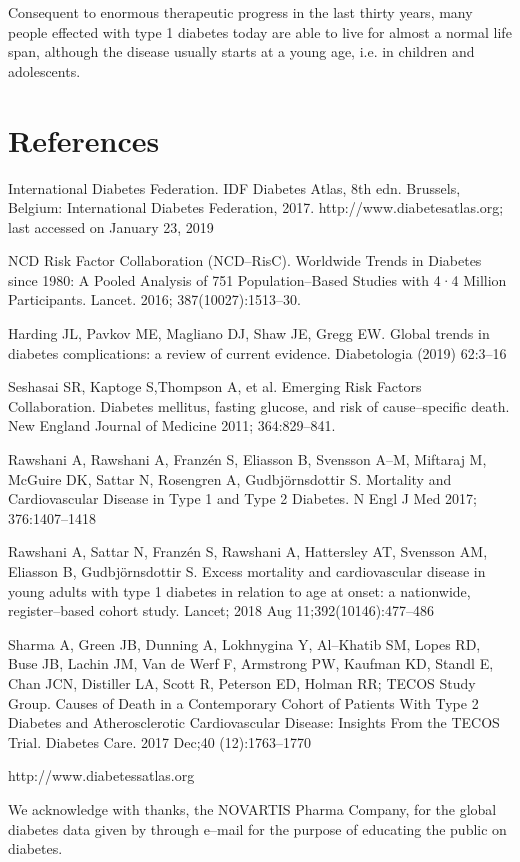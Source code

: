 Consequent to enormous therapeutic progress in the last thirty years, many people effected with type 1 diabetes today are able to live for almost a normal life span, although the disease usually starts at a young age, i.e. in children and adolescents.

\section*{References}

\begin{thebibliography}{99}
 International Diabetes Federation. IDF Diabetes Atlas, 8th edn. Brussels, Belgium: International Diabetes Federation, 2017. http://www.diabetesatlas.org; last accessed on January 23, 2019

  NCD Risk Factor Collaboration (NCD–RisC). Worldwide Trends in Diabetes since 1980: A Pooled Analysis of 751 Population–Based Studies with 4·4 Million Participants. Lancet. 2016; 387(10027):1513–30.

  Harding JL, Pavkov ME, Magliano DJ, Shaw JE, Gregg EW. Global trends in diabetes complications: a review of current evidence. Diabetologia (2019) 62:3–16

  Seshasai SR, Kaptoge S,Thompson A, et al. Emerging Risk Factors Collaboration. Diabetes mellitus, fasting glucose, and risk of cause–specific death. New England Journal of Medicine 2011; 364:829–841.

  Rawshani A, Rawshani A, Franzén S, Eliasson B, Svensson A–M, Miftaraj M, McGuire DK, Sattar N, Rosengren A, Gudbjörnsdottir S. Mortality and Cardiovascular Disease in Type 1 and Type 2 Diabetes. N Engl J Med 2017; 376:1407–1418

  Rawshani A, Sattar N, Franzén S, Rawshani A, Hattersley AT, Svensson AM, Eliasson B, Gudbjörnsdottir S. Excess mortality and cardiovascular disease in young adults with type 1 diabetes in relation to age at onset: a nationwide, register–based cohort study. Lancet; 2018 Aug 11;392(10146):477–486

  Sharma A, Green JB, Dunning A, Lokhnygina Y, Al–Khatib SM, Lopes RD, Buse JB, Lachin JM, Van de Werf F, Armstrong PW, Kaufman KD, Standl E, Chan JCN, Distiller LA, Scott R, Peterson ED, Holman RR; TECOS Study Group. Causes of Death in a Contemporary Cohort of Patients With Type 2 Diabetes and Atherosclerotic Cardiovascular Disease: Insights From the TECOS Trial. Diabetes Care. 2017 Dec;40 (12):1763–1770

  http://www.diabetessatlas.org

  We acknowledge with thanks, the NOVARTIS Pharma Company, for the global diabetes data given by through e–mail for the purpose of educating the public on diabetes.

 \end{thebibliography}

